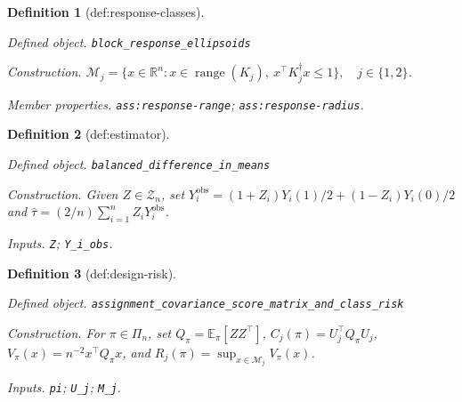 \documentclass{article}
\newtheorem{definition}{Definition}
\begin{document}
\begin{definition}[def:response-classes]\label{def:response-classes}
\par\smallskip\noindent\emph{Defined object.} \texttt{block\_\allowbreak{}response\_\allowbreak{}ellipsoids}
\par\smallskip\noindent\emph{Construction.} \(\mathcal M_j=\{x\in\mathbb R^n:x\in\operatorname{range}(K_j),\ x^\top K_j^\dagger x\le1\},\quad j\in\{1,2\}\).
\par\smallskip\noindent\emph{Member properties.} \texttt{ass:\allowbreak{}response-\allowbreak{}range}; \texttt{ass:\allowbreak{}response-\allowbreak{}radius}.
\end{definition}

\begin{definition}[def:estimator]\label{def:estimator}
\par\smallskip\noindent\emph{Defined object.} \texttt{balanced\_\allowbreak{}difference\_\allowbreak{}in\_\allowbreak{}means}
\par\smallskip\noindent\emph{Construction.} Given \(Z\in\mathcal Z_n\), set \(Y_i^{\mathrm{obs}}=(1+Z_i)Y_i(1)/2+(1-Z_i)Y_i(0)/2\) and \(\widehat\tau=(2/n)\sum_{i=1}^nZ_iY_i^{\mathrm{obs}}\).
\par\smallskip\noindent\emph{Inputs.} \texttt{Z}; \texttt{Y\_\allowbreak{}i\_\allowbreak{}obs}.
\end{definition}

\begin{definition}[def:design-risk]\label{def:design-risk}
\par\smallskip\noindent\emph{Defined object.} \texttt{assignment\_\allowbreak{}covariance\_\allowbreak{}score\_\allowbreak{}matrix\_\allowbreak{}and\_\allowbreak{}class\_\allowbreak{}risk}
\par\smallskip\noindent\emph{Construction.} For \(\pi\in\Pi_n\), set \(Q_\pi=\mathbb E_\pi[ZZ^\top]\), \(C_j(\pi)=U_j^\top Q_\pi U_j\), \(V_\pi(x)=n^{-2}x^\top Q_\pi x\), and \(R_j(\pi)=\sup_{x\in\mathcal M_j}V_\pi(x)\).
\par\smallskip\noindent\emph{Inputs.} \texttt{pi}; \texttt{U\_\allowbreak{}j}; \texttt{M\_\allowbreak{}j}.
\end{definition}
\end{document}

